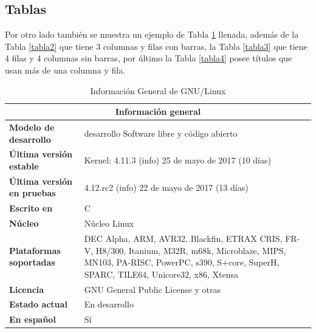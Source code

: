 \begin{definir}\label{definir1}
\lipsum[1] %
\end{definir}

\begin{prueba}\label{prueba1}
\lipsum[1] %
\end{prueba}

\begin{demostracion} \label{demo1}
\lipsum[1] %
\end{demostracion}

\begin{observacion}\label{obs1}
\lipsum[1] %
\end{observacion}

\subsection{Tablas}
Por otro lado también se muestra un ejemplo de Tabla \ref{tabla1} llenada, además de la Tabla \ref{tabla2} que tiene 3 columnas y filas con barras, la Tabla \ref{tabla3} que tiene 4 filas y 4 columnas sin barras, por último la Tabla \ref{tabla4} posee títulos que usan más de una columna y fila.

\begin{table}[hbt]
\begin{center}
\begin{tabular}{|l|p{10cm}|}\hline
\multicolumn{2}{|c|}{\textbf{Información general}}\\
\hline
\textbf{Modelo de desarrollo}&desarrollo	Software libre y código abierto\\
\textbf{Última versión estable}&Kernel: 4.11.3 (info) 25 de mayo de 2017 (10 días)\\
\textbf{Última versión en pruebas}&	4.12.rc2 (info) 22 de mayo de 2017 (13 días)\\
\textbf{Escrito en}&	C\\
\textbf{Núcleo}&	Núcleo Linux\\
\textbf{Plataformas soportadas}	& DEC Alpha, ARM, AVR32, Blackfin, ETRAX CRIS, FR-V, H8/300, Itanium, M32R, m68k, Microblaze, MIPS, MN103, PA-RISC, PowerPC, s390, S+core, SuperH, SPARC, TILE64, Unicore32, x86, Xtensa\\
\textbf{Licencia}	&GNU General Public License y otras\\
\textbf{Estado actual}	&En desarrollo\\
\textbf{En español}	&Sí\\
\hline
\end{tabular}
\end{center}
\caption{Información General de GNU/Linux}
\label{tabla1}
\end{table}


